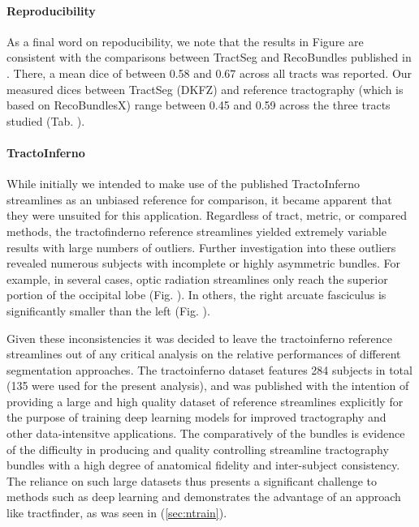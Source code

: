 \paragraph*{Reproducibility}

As a final word on repoducibility, we note that the results in Figure  are consistent with the comparisons between TractSeg and RecoBundles published in \textcite{Wasserthal2018}.
There, a mean \gls{dice} of between 0.58 and 0.67 across all tracts was reported.
Our measured \gls{dice}s between TractSeg (DKFZ) and reference tractography (which is based on RecoBundlesX\autocite{Garyfallidis2018}) range between 0.45 and 0.59 across the three tracts studied (Tab. ).

\paragraph*{TractoInferno}


While initially we intended to make use of the published TractoInferno streamlines as an unbiased reference for comparison, it became apparent that they were unsuited for this application.
Regardless of tract, metric, or compared methods, the tractofinderno reference streamlines yielded extremely variable results with large numbers of outliers.
Further investigation into these outliers revealed numerous subjects with incomplete or highly asymmetric bundles.
For example, in several cases, optic radiation streamlines only reach the superior portion of the occipital lobe (Fig. ).
In others, the right arcuate fasciculus is significantly smaller than the left (Fig. ).

Given these inconsistencies it was decided to leave the tractoinferno reference streamlines out of any critical analysis on the relative performances of different segmentation approaches.
The tractoinferno dataset features 284 subjects in total (135 were used for the present analysis), and was published with the intention of providing a large and high quality dataset of reference streamlines explicitly for the purpose of training deep learning models for improved tractography and other data-intensitve applications.
The comparatively  of the bundles is evidence of the difficulty in producing and quality controlling  streamline tractography bundles with a high degree of anatomical fidelity and inter-subject consistency.
The reliance on such large datasets thus presents a significant challenge to methods such as deep learning and demonstrates the advantage of an approach like tractfinder, as was seen in (\ref{sec:ntrain}).

